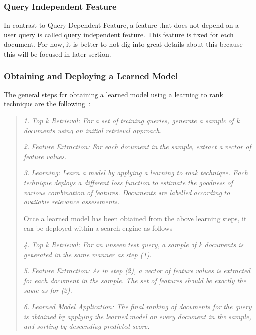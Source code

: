 \subsubsection{Query Independent Feature}\label{section:queryindependent}
In contrast to Query Dependent Feature, a feature that does not depend on a user query is called query independent feature. This feature is fixed for each
document. For now, it is better to not dig into great details about this because this will be focused in later section.

\subsubsection{Obtaining and Deploying a Learned Model} \label{section:learnedmodel}
The general steps for obtaining a learned model using a learning to rank technique are the following~\cite[P. 4]{learningmodel}:

\begin{quote}
  \item \textit{1. Top k Retrieval: For a set of training queries, generate a sample of k documents using an initial retrieval approach.}
  \item \textit{2. Feature Extraction: For each document in the sample, extract a vector of feature values.}
  \item \textit{3. Learning: Learn a model by applying a learning to rank technique. Each technique deploys a different loss function to estimate the goodness of
	various combination of features. Documents are labelled according to available relevance assessments.}

Once a learned model has been obtained from the above learning steps, it can be deployed within a search engine as follows~\cite[P. 4]{learningmodel}

 \item \textit{4. Top k Retrieval: For an unseen test query, a sample of k documents is generated in the same manner as step (1).}
 \item \textit{5. Feature Extraction: As in step (2), a vector of feature values is extracted for each document in the sample. The set of features should be exactly
	the same as for (2).}
 \item \textit{6. Learned Model Application: The final ranking of documents for the query is obtained by applying the learned model on every document in the sample,
	and sorting by descending predicted score.}
\end{quote}

